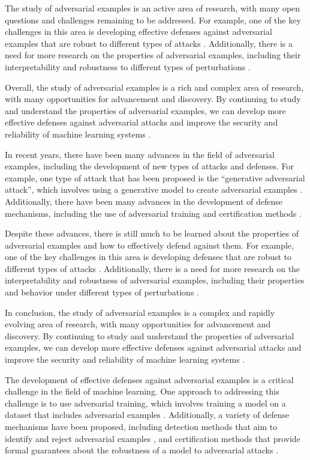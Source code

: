 \documentclass[11pt]{article}
\begin{document}
The study of adversarial examples is an active area of research, with many open questions and challenges remaining to be addressed. For example, one of the key challenges in this area is developing effective defenses against adversarial examples that are robust to different types of attacks \cite{ref30}. Additionally, there is a need for more research on the properties of adversarial examples, including their interpretability and robustness to different types of perturbations \cite{ref23}.

Overall, the study of adversarial examples is a rich and complex area of research, with many opportunities for advancement and discovery. By continuing to study and understand the properties of adversarial examples, we can develop more effective defenses against adversarial attacks and improve the security and reliability of machine learning systems \cite{ref31}.

In recent years, there have been many advances in the field of adversarial examples, including the development of new types of attacks and defenses. For example, one type of attack that has been proposed is the ``generative adversarial attack'', which involves using a generative model to create adversarial examples \cite{ref32}. Additionally, there have been many advances in the development of defense mechanisms, including the use of adversarial training and certification methods \cite{ref26}.

Despite these advances, there is still much to be learned about the properties of adversarial examples and how to effectively defend against them. For example, one of the key challenges in this area is developing defenses that are robust to different types of attacks \cite{ref30}. Additionally, there is a need for more research on the interpretability and robustness of adversarial examples, including their properties and behavior under different types of perturbations \cite{ref23}.

In conclusion, the study of adversarial examples is a complex and rapidly evolving area of research, with many opportunities for advancement and discovery. By continuing to study and understand the properties of adversarial examples, we can develop more effective defenses against adversarial attacks and improve the security and reliability of machine learning systems \cite{ref29}.

The development of effective defenses against adversarial examples is a critical challenge in the field of machine learning. One approach to addressing this challenge is to use adversarial training, which involves training a model on a dataset that includes adversarial examples \cite{ref27}. Additionally, a variety of defense mechanisms have been proposed, including detection methods that aim to identify and reject adversarial examples \cite{ref25}, and certification methods that provide formal guarantees about the robustness of a model to adversarial attacks \cite{ref26}.
\end{document}
